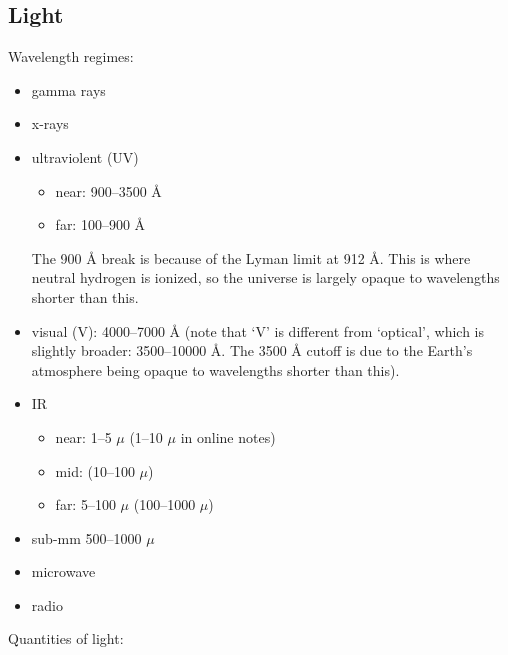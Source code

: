 \documentclass[12pt]{article}
\begin{document}
\subsection{Light}
Wavelength regimes:
\begin{itemize}
    \item gamma rays
    \item x-rays
    \item ultraviolent (UV)
        \begin{itemize}
            \item near: 900--3500 \AA{}
            \item far: 100--900 \AA{}
        \end{itemize}
        The 900 \AA{} break is because of the Lyman limit at 912 \AA{}.
        This is where neutral hydrogen is ionized, so the universe is largely
        opaque to wavelengths shorter than this.
    \item visual (V): 4000--7000 \AA{}
    (note that `V' is different from `optical',
        which is slightly broader: 3500--10000 \AA{}. The 3500 \AA{} cutoff
        is due to the Earth's atmosphere being opaque to wavelengths shorter
        than this).
    \item IR
        \begin{itemize}
            \item near: 1--5 $\mu$ (1--10 $\mu$ in online notes)
            \item mid: (10--100 $\mu$)
            \item far: 5--100 $\mu$ (100--1000 $\mu$)
        \end{itemize}
    \item sub-mm 500--1000 $\mu$
    \item microwave
    \item radio
\end{itemize}
Quantities of light:
\end{document}
